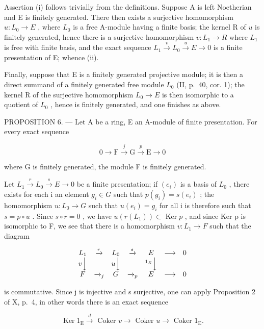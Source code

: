 Assertion (i) follows trivially from the definitions. Suppose A is left Noetherian and E is finitely generated. There then exists a surjective homomorphism \(u: L_0 \to E\) , where \(L_0\) is a free A-module having a finite basis; the kernel R of \(u\) is finitely generated, hence there is a surjective homomorphism \(v: L_1 \to R\) where \(L_1\) is free with finite basis, and the exact sequence \(L_1 \xrightarrow{v} L_0 \xrightarrow{u} E \longrightarrow 0\) is a finite presentation of E; whence (ii).

Finally, suppose that E is a finitely generated projective module; it is then a direct summand of a finitely generated free module \(L_{0}\) (II, p.~40, cor. 1); the kernel R of the surjective homomorphism \(L_{0} \rightarrow E\) is then isomorphic to a quotient of \(L_{0}\) , hence is finitely generated, and one finishes as above.

PROPOSITION 6. --- Let A be a ring, E an A-module of finite presentation. For every exact sequence

\[
0 \longrightarrow \mathrm{F} \stackrel {j} {\longrightarrow} \mathrm{G} \stackrel {p} {\longrightarrow} \mathrm{E} \longrightarrow 0
\]

where G is finitely generated, the module F is finitely generated.

Let \(L_{1} \xrightarrow{r} L_{0} \xrightarrow{s} E \longrightarrow 0\) be a finite presentation; if \((e_{i})\) is a basis of \(L_{0}\) , there exists for each i an element \(g_{i} \in G\) such that \(p(g_{i}) = s(e_{i})\) ; the homomorphism \(u : L_{0} \to G\) such that \(u(e_{i}) = g_{i}\) for all i is therefore such that \(s = p \circ u\) . Since \(s \circ r = 0\) , we have \(u(r(L_{1})) \subset \operatorname{Ker} p\) , and since Ker p is isomorphic to F, we see that there is a homomorphism \(v : L_{1} \to F\) such that the diagram

\[
\begin{array}{c c c c c c c} L _ {1} & \xrightarrow {r} & L _ {0} & \xrightarrow {s} & E & \longrightarrow & 0 \\ v \Big \downarrow & & u \Big \downarrow & & ^ {1 _ {E}} \Big \downarrow \\ F & \xrightarrow {} _ {j} & G & \xrightarrow {} _ {p} & E & \longrightarrow & 0 \end{array}
\]

is commutative. Since j is injective and s surjective, one can apply Proposition 2 of X, p.~4, in other words there is an exact sequence

\[
\operatorname{Ker} 1 _ {\mathrm{E}} \xrightarrow {d} \text { Coker } v \longrightarrow \text { Coker } u \longrightarrow \text { Coker } 1 _ {\mathrm{E}}.
\]

